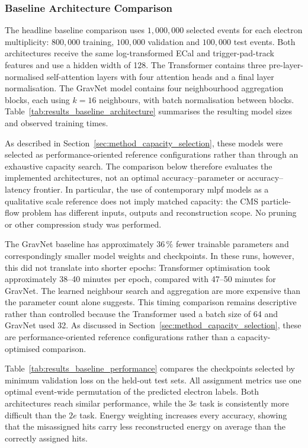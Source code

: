 \subsubsection{Baseline Architecture Comparison}

The headline baseline comparison uses \(1{,}000{,}000\) selected events for
each electron multiplicity: \(800{,}000\) training, \(100{,}000\) validation
and \(100{,}000\) test events.
Both architectures receive the same log-transformed ECal and trigger-pad-track
features and use a hidden width of 128. The Transformer contains three
pre-layer-normalised self-attention layers with four attention heads and a
final layer normalisation. The GravNet model contains four neighbourhood
aggregation blocks, each using \(k=16\) neighbours, with batch normalisation
between blocks. Table~\ref{tab:results_baseline_architecture} summarises the
resulting model sizes and observed training times.



As described in Section~\ref{sec:method_capacity_selection}, these models were
selected as performance-oriented reference configurations rather than through
an exhaustive capacity search. The comparison below therefore evaluates the
implemented architectures, not an optimal accuracy--parameter or
accuracy--latency frontier. In particular, the use of contemporary \gls{mlpf}
models as a qualitative scale reference does not imply matched capacity: the
CMS particle-flow problem has different inputs, outputs and reconstruction
scope. No pruning or other compression study was performed.


The GravNet baseline has approximately \(36\,\%\) fewer trainable parameters
and correspondingly smaller model weights and checkpoints. In these runs,
however, this did not translate into shorter epochs: Transformer optimisation
took approximately 38--40 minutes per epoch, compared with 47--50 minutes for
GravNet. The learned neighbour search and aggregation are more expensive than
the parameter count alone suggests. This timing comparison remains
descriptive rather than controlled because the Transformer used a batch size
of 64 and GravNet used 32. As discussed in
Section~\ref{sec:method_capacity_selection}, these are performance-oriented
reference configurations rather than a capacity-optimised comparison.

Table~\ref{tab:results_baseline_performance} compares the checkpoints selected
by minimum validation loss on the held-out test sets. All assignment metrics
use one optimal event-wide
permutation of the predicted electron labels. Both architectures reach similar
performance, while the \(3e\) task is consistently more difficult than the
\(2e\) task. Energy weighting increases every accuracy, showing that the
misassigned hits carry less reconstructed energy on average than the correctly
assigned hits.

